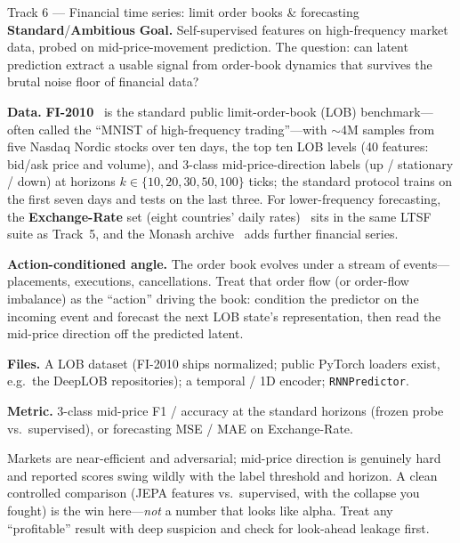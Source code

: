 \documentclass{article}
\newcommand{\code}[1]{\texttt{\small #1}}
\newcommand{\diffmed}{\colorbox{ebamber!18}{\textcolor{ebamber}{\small\bfseries Standard}}}
\newcommand{\diffhard}{\colorbox{ebred!15}{\textcolor{ebred}{\small\bfseries Ambitious}}}
\begin{document}
\begin{trackbox}{Track 6 --- Financial time series: limit order books \& forecasting \hfill \diffmed{}/\diffhard{}}
\textbf{Goal.} Self-supervised features on high-frequency market data, probed on
mid-price-movement prediction. The question: can latent prediction extract a usable
signal from order-book dynamics that survives the brutal noise floor of financial
data?

\smallskip
\textbf{Data.} \textbf{FI-2010}~\citep{FI2010} is the standard public limit-order-book
(LOB) benchmark---often called the ``MNIST of high-frequency trading''---with
$\sim$4M samples from five Nasdaq Nordic stocks over ten days, the top ten LOB
levels (40 features: bid/ask price and volume), and 3-class mid-price-direction
labels (up / stationary / down) at horizons $k \in \{10, 20, 30, 50, 100\}$ ticks;
the standard protocol trains on the first seven days and tests on the last three.
For lower-frequency forecasting, the \textbf{Exchange-Rate} set (eight countries'
daily rates)~\citep{LSTNet} sits in the same LTSF suite as Track~5, and the Monash
archive~\citep{MonashTSF} adds further financial series.

\smallskip
\textbf{Action-conditioned angle.} The order book evolves under a stream of
events---placements, executions, cancellations. Treat that order flow (or
order-flow imbalance) as the ``action'' driving the book: condition the predictor
on the incoming event and forecast the next LOB state's representation, then read
the mid-price direction off the predicted latent.

\smallskip
\textbf{Files.} A LOB dataset (FI-2010 ships normalized; public PyTorch loaders
exist, e.g.\ the DeepLOB repositories); a temporal / 1D encoder; \code{RNNPredictor}.

\smallskip
\textbf{Metric.} 3-class mid-price F1 / accuracy at the standard horizons
(frozen probe vs.\ supervised), or forecasting MSE / MAE on Exchange-Rate.

\begin{gotchabox}
Markets are near-efficient and adversarial; mid-price direction is genuinely hard
and reported scores swing wildly with the label threshold and horizon. A clean
controlled comparison (JEPA features vs.\ supervised, with the collapse you fought)
is the win here---\emph{not} a number that looks like alpha. Treat any
``profitable'' result with deep suspicion and check for look-ahead leakage first.
\end{gotchabox}


\end{trackbox}
\end{document}
